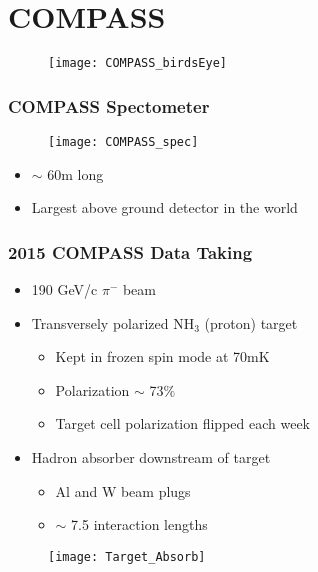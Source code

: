 \ifpdf
\graphicspath{ {Chapters/COMPASS/Figs/} }
\section{COMPASS}

\begin{frame}

  \begin{figure}
    \centering
    \texttt{[image: COMPASS\_birdsEye]}
  \end{figure}
\end{frame}


\begin{frame}
  \frametitle{COMPASS Spectometer}
  
  \begin{figure}
    \centering
    \texttt{[image: COMPASS\_spec]}
  \end{figure}

  \begin{itemize}
  \item $\sim$ 60m long
  \item Largest above ground detector in the world
  \end{itemize}
\end{frame}


\begin{frame}
  \frametitle{2015 COMPASS Data Taking}

  \begin{itemize}
  \item 190 GeV/c $\pi^-$ beam
  \item Transversely polarized NH$_3$ (proton) target
    \begin{itemize}
    \item Kept in frozen spin mode at 70mK
    \item Polarization $\sim$ 73$\%$
    \item Target cell polarization flipped each week
    \end{itemize}
  \item Hadron absorber downstream of target
    \begin{itemize}
    \item Al and W beam plugs
    \item $\sim$ 7.5 interaction lengths
    \end{itemize}
  \end{itemize}

  \begin{figure}
    \centering
    \texttt{[image: Target\_Absorb]}
  \end{figure}
\end{frame}
